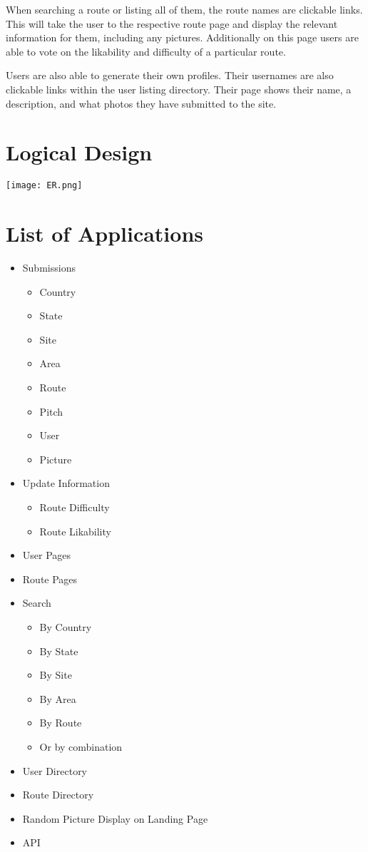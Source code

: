 \documentclass[12pt,letter]{article}
\begin{document}
When searching a route or listing all of them, the route names are clickable
links. This will take the user to the respective route page and display the
relevant information for them, including any pictures. Additionally on this page
users are able to vote on the likability and difficulty of a particular route.

Users are also able to generate their own profiles. Their usernames are also
clickable links within the user listing directory. Their page shows their name,
a description, and what photos they have submitted to the site. 

\section{Logical Design}
\texttt{[image: ER.png]}

\section{List of Applications}

\begin{itemize}
    \item Submissions
        \begin{itemize}
            \item Country
            \item State
            \item Site
            \item Area
            \item Route
            \item Pitch
            \item User
            \item Picture
        \end{itemize}
    \item Update Information
        \begin{itemize}
            \item Route Difficulty
            \item Route Likability
        \end{itemize}
    \item User Pages
    \item Route Pages
    \item Search
        \begin{itemize}
            \item By Country
            \item By State
            \item By Site
            \item By Area
            \item By Route
            \item Or by combination
        \end{itemize}
    \item User Directory
    \item Route Directory
    \item Random Picture Display on Landing Page
    \item API
\end{itemize}
\end{document}
